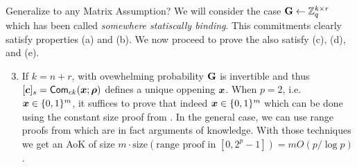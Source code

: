 {\color{red} Generalize to any Matrix Assumption?}
We will consider the case $\mathbf{{G}}\gets\mathbb{Z}_q^{k\times r}$ which has been called \emph{somewhere statiscally binding}. 
This commitments clearly satisfy properties (a) and (b). We now proceed to prove the also satisfy (c), (d), and (e).
\begin{enumerate}[label=(\alph*)]
\setcounter{enumi}{2}
\item If $k=n+r$, with ovewhelming probability $\mathbf{{G}}$ is invertible and thus $[{\boldsymbol{c}}]_s=\mathsf{Com}_{ck}({\boldsymbol{x}};{\boldsymbol{\rho}})$ defines a unique oppening ${\boldsymbol{x}}$. When $p=2$, i.e.~${\boldsymbol{x}}\in\{0,1\}^m$, it suffices to prove that indeed ${\boldsymbol{x}}\in\{0,1\}^m$ which can be done using the constant size proof from \cite{AC:GonHevRaf15}. In the general case, we can use range proofs from \cite{ACNS:GonRaf16} which are in fact arguments of knowledge. With those techniques we get an AoK of size $m\cdot\mathrm{size}(\text{range proof in }[0,2^p-1])=mO(p/\log p)$.


\end{enumerate}

